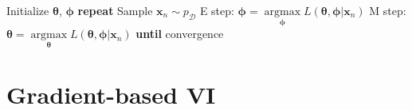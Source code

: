 \documentclass[../main.tex]{subfiles}
\begin{document}
\begin{algorithm}[H]
    \caption{Amortized stochastic variational EM}
    \begin{algorithmic}[1]
    \STATE Initialize $\boldsymbol{\theta}$, $\boldsymbol{\phi}$
    \STATE \textbf{repeat}
    \STATE \quad Sample $\boldsymbol{x}_{n} \sim  p_{\mathcal{D}}$
    \STATE \quad E step: $\boldsymbol{\phi} = \mathop{\arg\max}\limits_{\boldsymbol{\phi}} L(\boldsymbol{\theta}, \boldsymbol{\phi} | \boldsymbol{x}_{n})$
   \STATE \quad M step: $\boldsymbol{\theta} = \mathop{\arg\max}\limits_{\boldsymbol{\theta}} L(\boldsymbol{\theta}, \boldsymbol{\phi} | \boldsymbol{x}_{n})$
   \STATE \textbf{until} convergence
    \end{algorithmic}
\end{algorithm} 


\section{Gradient-based VI}
\end{document}
